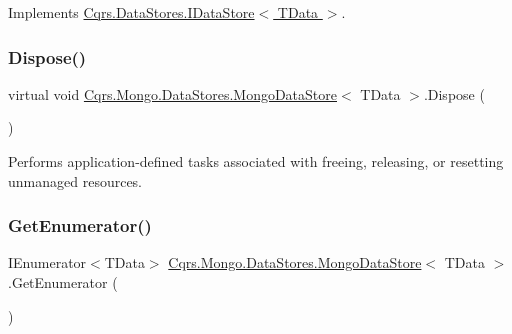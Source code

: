 Implements \hyperlink{interfaceCqrs_1_1DataStores_1_1IDataStore_aa7ade96f2f3151d5353cf7bdbb2baec5}{Cqrs.\+Data\+Stores.\+I\+Data\+Store$<$ T\+Data $>$}.

\mbox{\label{classCqrs_1_1Mongo_1_1DataStores_1_1MongoDataStore_a4af729196a5fa4962961c9ce38b74891}} 
\subsubsection{\texorpdfstring{Dispose()}{Dispose()}}
{\footnotesize\ttfamily virtual void \hyperlink{classCqrs_1_1Mongo_1_1DataStores_1_1MongoDataStore}{Cqrs.\+Mongo.\+Data\+Stores.\+Mongo\+Data\+Store}$<$ T\+Data $>$.Dispose (\begin{DoxyParamCaption}{ }\end{DoxyParamCaption})\hspace{0.3cm}{\ttfamily [virtual]}}



Performs application-\/defined tasks associated with freeing, releasing, or resetting unmanaged resources. 

\mbox{\label{classCqrs_1_1Mongo_1_1DataStores_1_1MongoDataStore_a3eeaf3e59a540025ff2aa0f62b5dd465}} 
\subsubsection{\texorpdfstring{Get\+Enumerator()}{GetEnumerator()}}
{\footnotesize\ttfamily I\+Enumerator$<$T\+Data$>$ \hyperlink{classCqrs_1_1Mongo_1_1DataStores_1_1MongoDataStore}{Cqrs.\+Mongo.\+Data\+Stores.\+Mongo\+Data\+Store}$<$ T\+Data $>$.Get\+Enumerator (\begin{DoxyParamCaption}{ }\end{DoxyParamCaption})}



